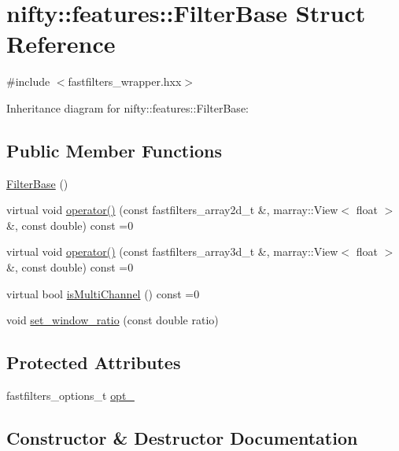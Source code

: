 \hypertarget{structnifty_1_1features_1_1FilterBase}{}\section{nifty\+:\+:features\+:\+:Filter\+Base Struct Reference}
\label{structnifty_1_1features_1_1FilterBase}


{\ttfamily \#include $<$fastfilters\+\_\+wrapper.\+hxx$>$}



Inheritance diagram for nifty\+:\+:features\+:\+:Filter\+Base\+:
\subsection*{Public Member Functions}
\begin{DoxyCompactItemize}
\item 
\hyperlink{structnifty_1_1features_1_1FilterBase_ac10b9d69df645dd2feb7ce555e544502}{Filter\+Base} ()
\item 
virtual void \hyperlink{structnifty_1_1features_1_1FilterBase_ab362e4142a783ce298a477557bcd9436}{operator()} (const fastfilters\+\_\+array2d\+\_\+t \&, marray\+::\+View$<$ float $>$ \&, const double) const  =0
\item 
virtual void \hyperlink{structnifty_1_1features_1_1FilterBase_ab7d7de20b106e80ccfd65a818e1b6eef}{operator()} (const fastfilters\+\_\+array3d\+\_\+t \&, marray\+::\+View$<$ float $>$ \&, const double) const  =0
\item 
virtual bool \hyperlink{structnifty_1_1features_1_1FilterBase_a01fbc04537c69b997079a98a845c5ab3}{is\+Multi\+Channel} () const  =0
\item 
void \hyperlink{structnifty_1_1features_1_1FilterBase_ab59d743ba07608b8aaa37e59f049431e}{set\+\_\+window\+\_\+ratio} (const double ratio)
\end{DoxyCompactItemize}
\subsection*{Protected Attributes}
\begin{DoxyCompactItemize}
\item 
fastfilters\+\_\+options\+\_\+t \hyperlink{structnifty_1_1features_1_1FilterBase_a4bd3a5f88a4c061e80f0b0c4a1074c8c}{opt\+\_\+}
\end{DoxyCompactItemize}


\subsection{Constructor \& Destructor Documentation}
\hypertarget{structnifty_1_1features_1_1FilterBase_ac10b9d69df645dd2feb7ce555e544502}{}
